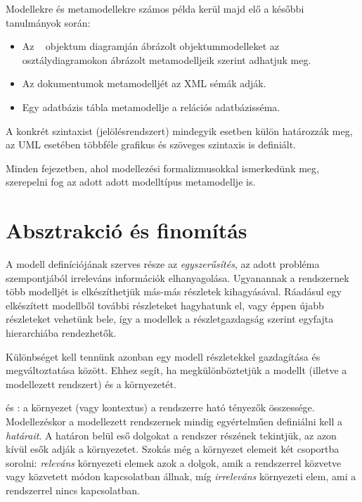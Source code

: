 \begin{pelda}
	Modellekre és metamodellekre számos példa kerül majd elő a későbbi tanulmányok során:
	\begin{itemize}
		\item Az ~\cite{UML} objektum diagramján ábrázolt objektummodelleket az osztálydiagramokon ábrázolt metamodelljeik szerint adhatjuk meg.
		\item Az  dokumentumok metamodelljét az XML sémák adják.
		\item Egy adatbázis tábla metamodellje a relációs adatbázisséma.
	\end{itemize}
	A konkrét szintaxist (jelölésrendszert) mindegyik esetben külön határozzák meg, az UML esetében többféle grafikus és szöveges szintaxis is definiált.
\end{pelda}

\begin{tipp}
	Minden fejezetben, ahol modellezési formalizmusokkal ismerkedünk meg, szerepelni fog az adott adott modelltípus metamodellje is.
\end{tipp}


\section{Absztrakció és finomítás}

A modell definíciójának szerves része az \emph{egyszerűsítés}, az adott probléma szempontjából irreleváns információk elhanyagolása. Ugyanannak a rendszernek több modelljét is elkészíthetjük más-más részletek kihagyásával. Ráadásul egy elkészített modellből további részleteket hagyhatunk el, vagy éppen újabb részleteket vehetünk bele, így a modellek a részletgazdagság szerint egyfajta hierarchiába rendezhetők.

Különbséget kell tennünk azonban egy modell részletekkel gazdagítása és megváltoztatása között. Ehhez segít, ha megkülönböztetjük a modellt (illetve a modellezett rendszert) és a környezetét.

\begin{definicio}
	 és : a környezet (vagy kontextus) a rendszerre ható tényezők összessége. Modellezéskor a modellezett rendszernek mindig egyértelműen definiálni kell a \emph{határait}. A határon belül eső dolgokat a rendszer részének tekintjük, az azon kívül esők adják a környezetet. Szokás még a környezet elemeit két csoportba sorolni: \emph{releváns} környezeti elemek azok a dolgok, amik a rendszerrel közvetve vagy közvetett módon kapcsolatban állnak, míg \emph{irreleváns} környezeti elem, ami a rendszerrel nincs kapcsolatban.
\end{definicio}

